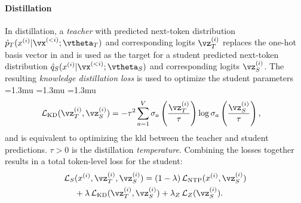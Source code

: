 \paragraph{Distillation}
In distillation, a \emph{teacher} with predicted next-token distribution
$\hat p_T(x^{(i)}|\vx^{(<i)};\vtheta_T)$
and corresponding logits $\vz_T^{(i)}$
replaces the one-hot basis vector in 
and is used as the target for a student predicted next-token distribution
$\hat q_S(x^{(i)}|\vx^{(<i)};\vtheta_S)$ and corresponding logits $\vz_S^{(i)}$.
The resulting \emph{knowledge distillation loss} is used to optimize the student parameters
	{
		\medmuskip=1.3mu
		\thinmuskip=1.3mu
		\thickmuskip=1.3mu
		\begin{align}
			\Ls_{\text{KD}}(\vz_T^{(i)},\vz_S^{(i)}) & =
			-\tau^2
			\sum_{a=1}^V \sigma_a
			\left(\frac{\vz_T^{(i)}}{\tau}\right)
			\log \sigma_a\left(\frac{\vz_S^{(i)}}{\tau}\right),
		\end{align}}and is equivalent to optimizing the \gls{kld} between the teacher and student predictions.
$\tau>0$ is the distillation \emph{temperature}.
Combining
the losses together results in a total token-level loss for the student:
	{
		\begin{align}
			\Ls_{S} & (x^{(i)},\vz_T^{(i)},\vz_S^{(i)})=
			(1-\lambda)\,\Ls_{\text{NTP}}(x^{(i)},\vz_S^{(i)})\nonumber
			\\                                  & +\lambda\,\Ls_{\text{KD}}(\vz_T^{(i)},\vz_S^{(i)}) +\lambda_Z\,\Ls_{Z}(\vz_S^{(i)}).
			                                   \label{eqn:kd_and_nll_full_loss}
		\end{align}
	}%

